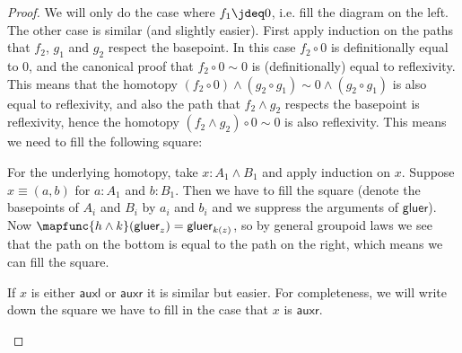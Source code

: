 \documentclass{article}
\newcommand{\smsh}{\wedge}
\newcommand{\tr}{\cdot}
\renewcommand{\o}{\ensuremath{\circ}}
\newcommand{\auxl}{\mathsf{auxl}}
\newcommand{\auxr}{\mathsf{auxr}}
\newcommand{\gluer}{\mathsf{gluer}}
\newcommand{\sy}{^{-1}}
\newcommand{\zeroh}{\mathsf{z}}
\begin{document}
\begin{proof}
  We will only do the case where $f_1\jdeq 0$, i.e. fill the diagram on the left. The other case is
  similar (and slightly easier). First apply induction on the paths that $f_2$, $g_1$ and $g_2$
  respect the basepoint. In this case $f_2\o0$ is definitionally equal to $0$, and the canonical
  proof that $f_2\o 0\sim0$ is (definitionally) equal to reflexivity. This means that the homotopy
  $(f_2 \o 0)\smsh (g_2 \o g_1)\sim0\smsh (g_2 \o g_1)$ is also equal to reflexivity, and also the
  path that $f_2 \smsh g_2$ respects the basepoint is reflexivity, hence the homotopy
  $(f_2 \smsh g_2)\o 0\sim0$ is also reflexivity. This means we need to fill the following square:
\begin{center}
\end{center}

  For the underlying homotopy, take $x : A_1\smsh B_1$ and apply induction on $x$. Suppose
  $x\equiv(a,b)$ for $a:A_1$ and $b:B_1$. Then we have to fill the square (denote the basepoints of
  $A_i$ and $B_i$ by $a_i$ and $b_i$ and we suppress the arguments of $\gluer$). Now
  $\mapfunc{h\smsh k}(\gluer_z)=\gluer_{k(z)}$, so by general groupoid laws we see that the path on
  the bottom is equal to the path on the right, which means we can fill the square.
  \begin{center}
  \end{center}
  If $x$ is either $\auxl$ or $\auxr$ it is similar but easier. For completeness, we will write down the square we have to fill in the case that $x$ is $\auxr$.
  \begin{center}
  \end{center}


\end{proof}
\end{document}
